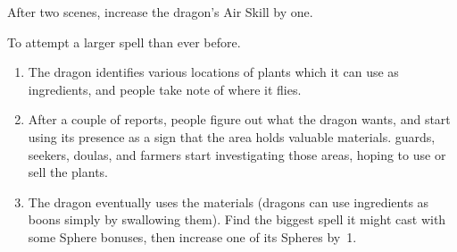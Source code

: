 \begin{multicols}{2}
\begin{dlist}
  After two scenes, increase the dragon's Air Skill by one.
  \item
  To attempt a larger spell than ever before.
  \begin{enumerate}
    \item
    The dragon identifies various locations of plants which it can use as \glspl{ingredient}, and people take note of where it flies.
    \item
    After a couple of reports, people figure out what the dragon wants, and start using its presence as a sign that the area holds valuable materials.
    \Glspl{guard}, \glspl{seeker}, \glspl{doula}, and farmers start investigating those areas, hoping to use or sell the plants.
    \item
    The dragon eventually uses the materials (dragons can use \glspl{ingredient} as \glspl{boon} simply by swallowing them).
    Find the biggest spell it might cast with some Sphere bonuses, then increase one of its Spheres by~1.
  \end{enumerate}
\end{dlist}

\end{multicols}

\section{}
\label{dryad}



